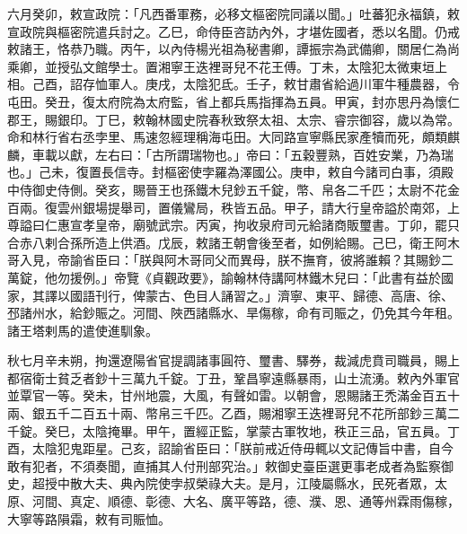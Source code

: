 \begin{pinyinscope}
 六月癸卯，敕宣政院：「凡西番軍務，必移文樞密院同議以聞。」吐蕃犯永福鎮，敕宣政院與樞密院遣兵討之。乙巳，命侍臣咨訪內外，才堪佐國者，悉以名聞。仍戒敕諸王，恪恭乃職。丙午，以內侍楊光祖為秘書卿，譚振宗為武備卿，關居仁為尚乘卿，並授弘文館學士。置湘寧王迭裡哥兒不花王傅。丁未，太陰犯太微東垣上相。己酉，詔存恤軍人。庚戌，太陰犯氐。壬子，敕甘肅省給過川軍牛種農器，令屯田。癸丑，復太府院為太府監，省上都兵馬指揮為五員。甲寅，封亦思丹為懷仁郡王，賜銀印。丁巳，敕翰林國史院春秋致祭太祖、太宗、睿宗御容，歲以為常。命和林行省右丞孛里、馬速忽經理稱海屯田。大同路宣寧縣民家產犢而死，頗類麒麟，車載以獻，左右曰：「古所謂瑞物也。」帝曰：「五穀豐熟，百姓安業，乃為瑞也。」己未，復置長信寺。封樞密使孛羅為澤國公。庚申，敕自今諸司白事，須殿中侍御史侍側。癸亥，賜晉王也孫鐵木兒鈔五千錠，幣、帛各二千匹；太尉不花金百兩。復雲州銀場提舉司，置儀鸞局，秩皆五品。甲子，請大行皇帝謚於南郊，上尊謚曰仁惠宣孝皇帝，廟號武宗。丙寅，拘收泉府司元給諸商販璽書。丁卯，罷只合赤八剌合孫所造上供酒。戊辰，敕諸王朝會後至者，如例給賜。己巳，衛王阿木哥入見，帝諭省臣曰：「朕與阿木哥同父而異母，朕不撫育，彼將誰賴？其賜鈔二萬錠，他勿援例。」帝覽《貞觀政要》，諭翰林侍講阿林鐵木兒曰：「此書有益於國家，其譯以國語刊行，俾蒙古、色目人誦習之。」濟寧、東平、歸德、高唐、徐、邳諸州水，給鈔賑之。河間、陜西諸縣水、旱傷稼，命有司賑之，仍免其今年租。諸王塔剌馬的遣使進馴象。



 秋七月辛未朔，拘還遼陽省官提調諸事圓符、璽書、驛券，裁減虎賁司職員，賜上都宿衛士貧乏者鈔十三萬九千錠。丁丑，鞏昌寧遠縣暴雨，山土流湧。敕內外軍官並覃官一等。癸未，甘州地震，大風，有聲如雷。以朝會，恩賜諸王禿滿金百五十兩、銀五千二百五十兩、幣帛三千匹。乙酉，賜湘寧王迭裡哥兒不花所部鈔三萬二千錠。癸巳，太陰掩畢。甲午，置經正監，掌蒙古軍牧地，秩正三品，官五員。丁酉，太陰犯鬼距星。己亥，詔諭省臣曰：「朕前戒近侍毋輒以文記傳旨中書，自今敢有犯者，不須奏聞，直捕其人付刑部究治。」敕御史臺臣選更事老成者為監察御史，超授中散大夫、典內院使孛叔榮祿大夫。是月，江陵屬縣水，民死者眾，太原、河間、真定、順德、彰德、大名、廣平等路，德、濮、恩、通等州霖雨傷稼，大寧等路隕霜，敕有司賑恤。




\end{pinyinscope}
